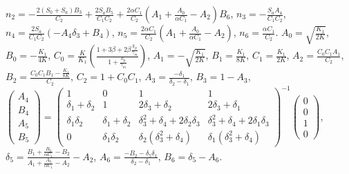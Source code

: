 \documentclass[notitlepage,dvips,rmp,fleqn,superscriptaddress,floatfix]{revtex4-1}
\begin{document}
$\displaystyle n_2 = -\frac{2 \left(S_0+S_a\right) B_3}{C_2}  + \frac{2 S_a B_5}{C_1 C_2} + \frac{2 \alpha C_1}{C_2} \left(A_1 + \frac{A_0}{\alpha C_1} -A_2\right) B_6$,
$\displaystyle n_3 = -\frac{S_a A_4}{C_1 C_2}  $,
$\displaystyle n_4 = \frac{2 S_a}{C_1 C_2} \left(-A_4 \delta_3+B_4\right) $,
$\displaystyle n_5 = \frac{2 \alpha C_1}{C_2} \left(A_1+\frac{A_0}{\alpha C_1}-A_2\right) $,
$\displaystyle n_6 = \frac{\alpha C_1}{C_2}$.
$\displaystyle A_0 = \sqrt{\frac{K_1}{2 K}}$,
$\displaystyle B_0 = -\frac{K_1}{4 K}$,
$\displaystyle C_0 = \frac{K}{K_1} \left(\frac{1 + 3 \beta + 2 \beta \frac{k_p}{\gamma_m } }{1 + \frac{k_p}{\gamma_m } } \right)$,
$\displaystyle A_1 = -\sqrt{\frac{K_1}{2 K}}$,
$\displaystyle B_1 = \frac{K_1}{8 K}$,
$\displaystyle C_1 = \frac{K_1}{2 K}$,
$\displaystyle A_2 = \frac{C_0 C_1 A_1}{C_2}$,
$\displaystyle B_2 = \frac{C_0 C_1 B_1 - \frac{K_1}{8 K} }{C_2}$,
$\displaystyle C_2 = 1 + C_0 C_1 $,
$\displaystyle A_3 = \frac{-\delta_1}{\delta _2 - \delta_1}$,
$\displaystyle B_3 = 1-A_3$,
$\displaystyle \begin{pmatrix}
  A_4  \\
  B_4  \\
 A_5  \\
  B_5 
 \end{pmatrix} =
 \begin{pmatrix}
  1& 0 & 1 & 1 \\
  \delta_1+ \delta_2& 1 & 2\delta_3+ \delta_2 &  2\delta_3+\delta_1 \\
  \delta_1  \delta_2 & \delta_1+ \delta_2  & \delta_3^2+\delta_4+2  \delta_2 \delta_3 &  \delta_3^2+\delta_4+2 \delta_1 \delta_3 \\
  0 &  \delta_1  \delta_2 &  \delta_2 \left(\delta_3^2+\delta_4\right) & \delta_1 \left(\delta_3^2+\delta_4\right) 
 \end{pmatrix}^{-1} \begin{pmatrix}
  0 \\
 0  \\
 1  \\
  0
 \end{pmatrix} $,
$\displaystyle \delta_5 = \frac{B_1+\frac{B_0}{\alpha C_1}-B_2}{A_1+\frac{A_0}{\alpha C_1}-A_2} - A_2$,
$\displaystyle A_6 =  \frac{-B_2 -\delta_5 \delta_1}{\delta _2 - \delta_1} $,
$\displaystyle B_6 = \delta_5  - A_6  $.

%
\end{document}
